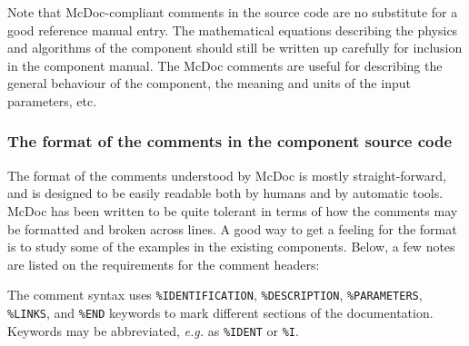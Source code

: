 Note that McDoc-compliant comments in the source code are no substitute
for a good reference manual entry. The mathematical equations describing
the physics and algorithms of the component should still be written up
carefully for inclusion in the component manual. The McDoc comments are
useful for describing the general behaviour of the component, the
meaning and units of the input parameters, etc.


\subsubsection{The format of the comments in the component source code}

The format of the comments understood by McDoc is mostly
straight-forward, and is designed to be easily readable both by humans
and by automatic tools. McDoc has been written to be quite tolerant in
terms of how the comments may be formatted and broken across lines. A
good way to get a feeling for the format is to study some of the examples
in the existing components. Below, a few
notes are listed on the requirements for the comment headers:

The comment syntax uses \verb+%IDENTIFICATION+, \verb+%DESCRIPTION+,
\verb+%PARAMETERS+, \verb+%LINKS+, and \verb+%END+
keywords to mark different sections of the documentation. Keywords may
be abbreviated, \textit{e.g.} as \verb+%IDENT+ or \verb+%I+.

